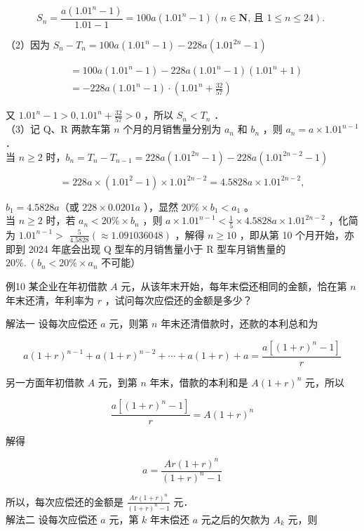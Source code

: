 \documentclass[10pt]{article}
\begin{document}
\[
S_{n}=\frac{a\left(1.01^{n}-1\right)}{1.01-1}=100 a\left(1.01^{n}-1\right)(n \in \mathbf{N} \text {, 且 } 1 \leqslant n \leqslant 24) \text {. }
\]

（2）因为 \(S_{n}-T_{n}=100 a\left(1.01^{n}-1\right)-228 a\left(1.01^{2 n}-1\right)\)

\[
\begin{aligned}
& =100 a\left(1.01^{n}-1\right)-228 a\left(1.01^{n}-1\right)\left(1.01^{n}+1\right) \\
& =-228 a\left(1.01^{n}-1\right) \cdot\left(1.01^{n}+\frac{32}{57}\right)
\end{aligned}
\]

又 \(1.01^{n}-1>0,1.01^{n}+\frac{32}{57}>0\) ，所以 \(S_{n}<T_{n}\) ．\\
（3）记 \(\mathrm{Q} 、 \mathrm{R}\) 两款车第 \(n\) 个月的月销售量分别为 \(a_{n}\) 和 \(b_{n}\) ，则 \(a_{n}=a \times 1.01^{n-1}\) ．\\
当 \(n \geqslant 2\) 时，\(b_{n}=T_{n}-T_{n-1}=228 a\left(1.01^{2 n}-1\right)-228 a\left(1.01^{2 n-2}-1\right)\)

\[
=228 a \times\left(1.01^{2}-1\right) \times 1.01^{2 n-2}=4.5828 a \times 1.01^{2 n-2},
\]

\(b_{1}=4.5828 a\)（或 \(228 \times 0.0201 a\) ），显然 \(20 \% \times b_{1}<a_{1}\) 。\\
当 \(n \geqslant 2\) 时，若 \(a_{n}<20 \% \times b_{n}\) ，则 \(a \times 1.01^{n-1}<\frac{1}{5} \times 4.5828 a \times 1.01^{2 n-2}\) ，化简为 \(1.01^{n-1}>\) \(\frac{5}{4.5828}(\approx 1.091036048)\) ，解得 \(n \geqslant 10\) ，即从第 10 个月开始，亦即到 2024 年底会出现 Q 型车的月销售量小于 R 型车月销售量的 \(20 \% . ~\left(b_{n}<20 \% \times a_{n}\right.\) 不可能）

例10 某企业在年初借款 \(A\) 元，从该年末开始，每年末偿还相同的金额，恰在第 \(n\) 年末还清，年利率为 \(r\) ，试问每次应偿还的金额是多少？

解法一 设每次应偿还 \(a\) 元，则第 \(n\) 年末还清借款时，还款的本利总和为

\[
a(1+r)^{n-1}+a(1+r)^{n-2}+\cdots+a(1+r)+a=\frac{a\left[(1+r)^{n}-1\right]}{r}
\]

另一方面年初借款 \(A\) 元，到第 \(n\) 年末，借款的本利和是 \(A(1+r)^{n}\) 元，所以

\[
\frac{a\left[(1+r)^{n}-1\right]}{r}=A(1+r)^{n}
\]

解得

\[
a=\frac{A r(1+r)^{n}}{(1+r)^{n}-1}
\]

所以，每次应偿还的金额是 \(\frac{A r(1+r)^{n}}{(1+r)^{n}-1}\) 元．\\
解法二 设每次应偿还 \(a\) 元，第 \(k\) 年末偿还 \(a\) 元之后的欠款为 \(A_{k}\) 元，则
\end{document}
